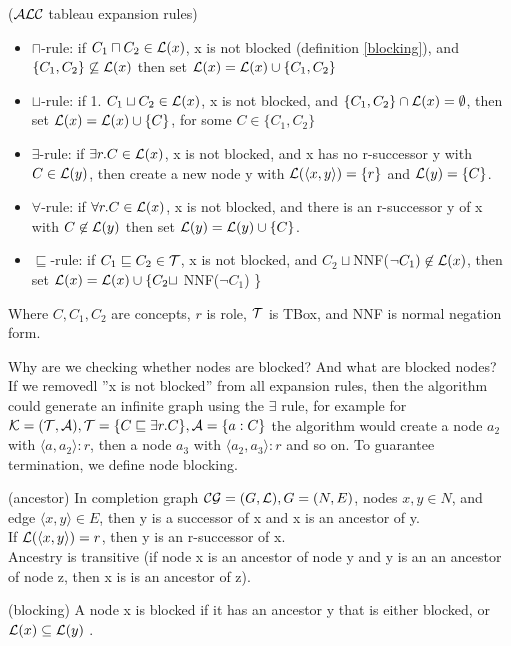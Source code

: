 \begin{mydef} \cite{handbook2} ($\mathcal{ALC}$ tableau expansion rules)
\begin{itemize}
\item $\sqcap$-rule: if 	 $C_1 \sqcap C_2 \in \mathcal{L} (x)$, x is not blocked (definition \ref{blocking}), and 
$\{C_1, C_2\} \not\subseteq  \mathcal{L} (x)$
then set $\mathcal{L} (x) = \mathcal{L} (x) \cup \{C_1, C_2\}$
\item $\sqcup$-rule: if 1. $C_1 \sqcup C_2 \in \mathcal{L} (x)$, x is not blocked, and 
$\{C_1, C_2\} \cap  \mathcal{L} (x) = \emptyset$,
then set $\mathcal{L} (x) = \mathcal{L} (x) \cup \{C\}$, for some $C \in \{C_1,C_2\}$
\item $\exists$-rule: if  $\exists r.C \in \mathcal{L} (x)$, x is not blocked, and
x has no r-successor y with $C \in \mathcal{L} (y)$,
then create a new node y with $\mathcal{L} (\langle x, y \rangle) = \{r\}$ and $\mathcal{L} (y) = \{C\}$.
\item $\forall$-rule: if $\forall r.C \in \mathcal{L} (x)$, x is not blocked, and
there is an r-successor y of x with $C \not\in \mathcal{L} (y)$
then set $\mathcal{L}(y) = \mathcal{L}(y) \cup \{C\}$.
\item $\sqsubseteq$-rule: if  $C_1 \sqsubseteq C_2 \in \mathcal{T} $, x is not blocked, and
$C_2 \sqcup $NNF($\neg C_1) \not\in \mathcal{L} (x)$,
then set $\mathcal{L} (x) = \mathcal{L} (x) \cup \{C_2 \sqcup$ NNF($\neg C_1$) \} 
\end{itemize}
Where $C, C_1, C_2$ are concepts, $r$ is role, $\mathcal{T}$ is TBox, and NNF is normal negation form.
\end{mydef}

Why are we checking whether nodes are blocked? And what are blocked nodes? \\
If we removedl ''x is not blocked'' from all expansion rules, then the algorithm could generate an infinite graph using the $\exists$ rule, for example for 
$\mathcal{K} =(\mathcal{T} ,\mathcal{A}), \mathcal{T} = \{C \sqsubseteq \exists r.C \}, \mathcal{A}=\{a:C\}$ the algorithm would create a node $a_2$ with $\langle a,a_2 \rangle :r$, then a node $a_3$ with $\langle a_2,a_3\rangle :r$ and so on.
To guarantee termination, we define node blocking.
\begin{mydef} \label{ancestor} (ancestor)
In completion graph $\mathcal{CG} = (G, \mathcal{L}), G=(N,E)$, nodes $x,y \in N$, and edge $\langle x,y \rangle \in E$, then y is a successor of x and x is an ancestor of y. \\
If $\mathcal{L} (\langle x,y \rangle) = r$, then y is an r-successor of x. \\
Ancestry is transitive (if node x is an ancestor of node y and y is an an ancestor of node z, then x is is an ancestor of z).

\end{mydef}
\begin{mydef} \label{blocking}(blocking)
A node x is blocked if it has an ancestor y that is either blocked, or $\mathcal{L} (x) \subseteq \mathcal{L} (y)$ .
\end{mydef}

